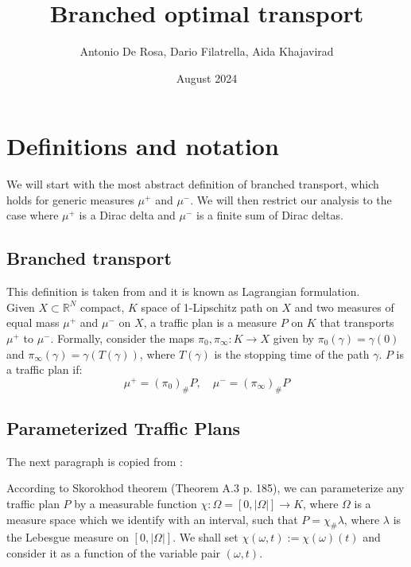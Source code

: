 \documentclass{article}
\title{Branched optimal transport}
\author{Antonio De Rosa, Dario Filatrella, Aida Khajavirad}
\date{August 2024}
\begin{document}
    \maketitle


    \tableofcontents
    \newpage


    \section{Definitions and notation}


    We will start with the most abstract definition of branched transport, which holds for generic measures $\mu^+$ and $\mu^-$.
    We will then restrict our analysis to the case where $\mu^+$ is a Dirac delta and $\mu^-$ is a finite sum of Dirac deltas.

    \subsection{Branched transport}

    This definition is taken from \cite{Bernot} and it is known as Lagrangian formulation. \\

    Given $X \subset \mathbb{R}^N$ compact, $K$ space of 1-Lipschitz path on $X$ and two measures of equal mass $\mu^+$ and $\mu^-$ on $X$, a traffic plan is
    a measure $P$ on $K$ that transports $\mu^+$ to $\mu^-$.
    Formally, consider the maps $\pi_0, \pi_\infty : K \rightarrow X$ given by $\pi_0(\gamma) = \gamma(0)$ and $\pi_\infty(\gamma) = \gamma(T(\gamma))$, where $T(\gamma)$
    is the stopping time of the path $\gamma$.
    $P$ is a traffic plan if:
    \[
        \mu^+ = (\pi_0)_{\#}P, \quad \mu^- = (\pi_\infty)_{\#}P
    \]

    \subsection{Parameterized Traffic Plans}
    The next paragraph is copied from \cite[Bernot Caselles]{Bernot}:

    According to Skorokhod theorem (Theorem A.3 p. 185), we can parameterize any traffic plan $P$ by a measurable function
    $\chi : \Omega = [0, |\Omega|] \rightarrow K$, where $\Omega$ is a measure space which we identify with an interval, such that
    $P = \chi_{\#} \lambda$, where $\lambda$ is the Lebesgue measure on $[0, |\Omega|]$.
    We shall set $\chi(\omega, t) := \chi(\omega)(t)$ and consider it as a function of the variable pair
    $(\omega, t)$.
\end{document}
